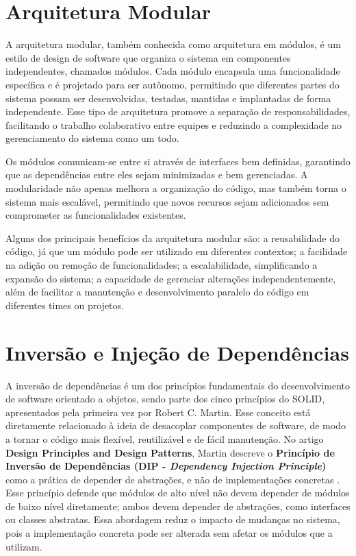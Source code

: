 \section{Arquitetura Modular}

A arquitetura modular, também conhecida como arquitetura em módulos, é um estilo de design de software que organiza o sistema em componentes independentes, chamados módulos. Cada módulo encapsula uma funcionalidade específica e é projetado para ser autônomo, permitindo que diferentes partes do sistema possam ser desenvolvidas, testadas, mantidas e implantadas de forma independente. Esse tipo de arquitetura promove a separação de responsabilidades, facilitando o trabalho colaborativo entre equipes e reduzindo a complexidade no gerenciamento do sistema como um todo.

Os módulos comunicam-se entre si através de interfaces bem definidas, garantindo que as dependências entre eles sejam minimizadas e bem gerenciadas. A modularidade não apenas melhora a organização do código, mas também torna o sistema mais escalável, permitindo que novos recursos sejam adicionados sem comprometer as funcionalidades existentes.

Alguns dos principais benefícios da arquitetura modular são: a reusabilidade do código, já que um módulo pode ser utilizado em diferentes contextos; a facilidade na adição ou remoção de funcionalidades; a escalabilidade, simplificando a expansão do sistema; a capacidade de gerenciar alterações independentemente, além de facilitar a manutenção e desenvolvimento paralelo do código em diferentes times ou projetos.

\section{Inversão e Injeção de Dependências}
A inversão de dependências é um dos princípios fundamentais do desenvolvimento de software orientado a objetos, sendo parte dos cinco princípios do SOLID, apresentados pela primeira vez por Robert C. Martin. Esse conceito está diretamente relacionado à ideia de desacoplar componentes de software, de modo a tornar o código mais flexível, reutilizável e de fácil manutenção. No artigo \textbf{Design Principles and Design Patterns}, Martin descreve o \textbf{Princípio de Inversão de Dependências (DIP - \textit{Dependency Injection Principle})} como a prática de depender de abstrações, e não de implementações concretas \cite[p.~12]{martin2000design}. Esse princípio defende que módulos de alto nível não devem depender de módulos de baixo nível diretamente; ambos devem depender de abstrações, como interfaces ou classes abstratas. Essa abordagem reduz o impacto de mudanças no sistema, pois a implementação concreta pode ser alterada sem afetar os módulos que a utilizam.

